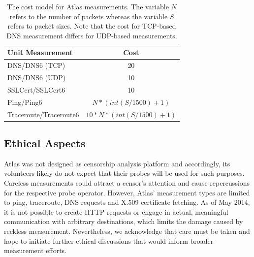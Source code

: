 %
%
%

% 

\begin{table}[ht!]
\centering
\begin{tabular}{lc}
\hline
\textbf{Unit Measurement} & \textbf{Cost} \\
\hline 
DNS\slash DNS6 (TCP) & 20\\ 
DNS\slash DNS6 (UDP) & 10\\ 
SSLCert\slash SSLCert6 & 10 \\
Ping\slash Ping6 & $N * (int(S/1500)+1)$\\
Traceroute\slash Traceroute6 & $ 10*N*(int(S/1500)+1)$\\[1ex] 
\hline 
\end{tabular} 
\caption{The cost model for Atlas measurements.  The variable $N$ refers to the
number of packets whereas the variable $S$ refers to packet sizes.  Note that
the cost for TCP-based DNS measurement differs for UDP-based measurements.}
\label{tab:cost} 
\end{table}

\subsection{Ethical Aspects}
Atlas was not designed as censorship analysis platform and accordingly, its
volunteers likely do not expect that their probes will be used for such
purposes.  Careless measurements could attract a censor's attention and cause
repercussions for the respective probe operator. However, Atlas' measurement types are limited to ping, traceroute, DNS requests and X.509 certificate fetching.  As of May 2014, it is not possible to create HTTP requests or engage in actual, meaningful communication with arbitrary destinations, which limits the damage caused by reckless measurement. Nevertheless, we acknowledge that care must be taken and hope to initiate further ethical discussions that would inform broader measurement efforts.
